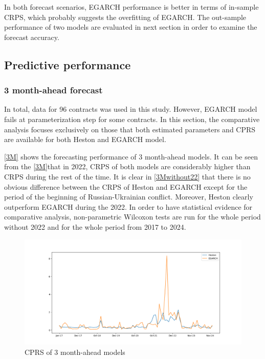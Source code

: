 \documentclass[12pt,a4paper]{article}
\newcommand\colorAutoref[1]{{\hypersetup{linkcolor=black}\autoref{#1}}}
\numberwithin{equation}{section}
\begin{document}
In both forecast scenarios, EGARCH performance is better in terms of in-sample CRPS, which probably suggests the overfitting of EGARCH. The out-sample performance of two models are evaluated in next section in order to examine the forecast accuracy.

\subsection{Predictive performance}

\subsubsection{3 month-ahead forecast}

 In total, data for 96 contracts was used in this study. However, EGARCH model fails at parameterization step for some contracts. In this section, the comparative analysis focuses exclusively on those that both estimated parameters and CPRS are available for both Heston and EGARCH model.
 
 \colorAutoref{3M} shows the forecasting performance of 3 month-ahead models. It can be seen from the \colorAutoref{3M}that in 2022, CRPS of both models are considerably higher than CRPS during the rest of the time. It is clear in \colorAutoref{3Mwithout22} that there is no obvious difference between the CRPS of Heston and EGARCH except for the period of the beginning of Russian-Ukrainian conflict. Moreover, Heston clearly outperform EGARCH during the 2022. In order to have statistical evidence for comparative analysis, non-parametric Wilcoxon tests are run for the whole period without 2022 and for the whole period from 2017 to 2024. 
 

\begin{figure}[h!] 
\includegraphics[scale=1,width=1\linewidth,height=0.4\textheight]{threemonthahead.png}
\caption{CPRS of 3 month-ahead models}
\label{3M}
\end{figure}
\end{document}
